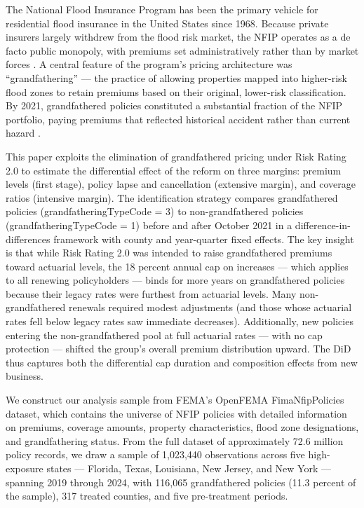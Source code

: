 \documentclass[12pt]{article}
\begin{document}
The National Flood Insurance Program has been the primary vehicle for residential flood insurance in the United States since 1968. Because private insurers largely withdrew from the flood risk market, the NFIP operates as a de facto public monopoly, with premiums set administratively rather than by market forces \citep{kousky2018, michel-kerjan2015}. A central feature of the program's pricing architecture was ``grandfathering'' --- the practice of allowing properties mapped into higher-risk flood zones to retain premiums based on their original, lower-risk classification. By 2021, grandfathered policies constituted a substantial fraction of the NFIP portfolio, paying premiums that reflected historical accident rather than current hazard \citep{horn2018}.

This paper exploits the elimination of grandfathered pricing under Risk Rating 2.0 to estimate the differential effect of the reform on three margins: premium levels (first stage), policy lapse and cancellation (extensive margin), and coverage ratios (intensive margin). The identification strategy compares grandfathered policies (grandfatheringTypeCode = 3) to non-grandfathered policies (grandfatheringTypeCode = 1) before and after October 2021 in a difference-in-differences framework with county and year-quarter fixed effects. The key insight is that while Risk Rating 2.0 was intended to raise grandfathered premiums toward actuarial levels, the 18 percent annual cap on increases --- which applies to all renewing policyholders --- binds for more years on grandfathered policies because their legacy rates were furthest from actuarial levels. Many non-grandfathered renewals required modest adjustments (and those whose actuarial rates fell below legacy rates saw immediate decreases). Additionally, new policies entering the non-grandfathered pool at full actuarial rates --- with no cap protection --- shifted the group's overall premium distribution upward. The DiD thus captures both the differential cap duration and composition effects from new business.

We construct our analysis sample from FEMA's OpenFEMA FimaNfipPolicies dataset, which contains the universe of NFIP policies with detailed information on premiums, coverage amounts, property characteristics, flood zone designations, and grandfathering status. From the full dataset of approximately 72.6 million policy records, we draw a sample of 1,023,440 observations across five high-exposure states --- Florida, Texas, Louisiana, New Jersey, and New York --- spanning 2019 through 2024, with 116,065 grandfathered policies (11.3 percent of the sample), 317 treated counties, and five pre-treatment periods.
\end{document}
